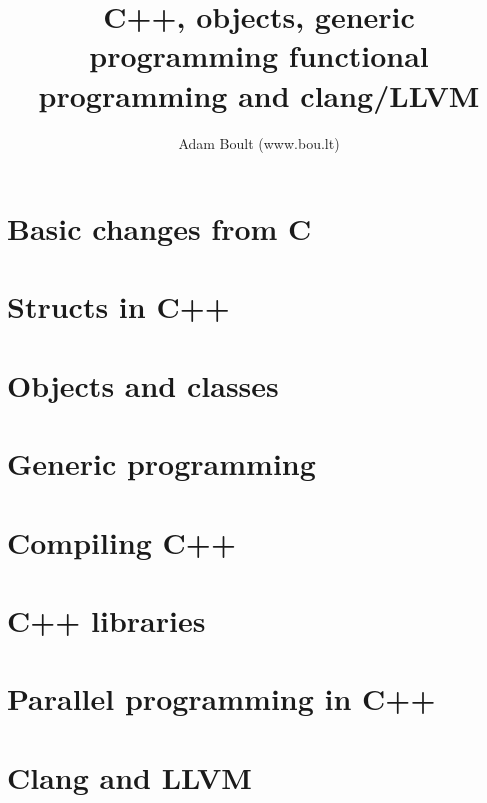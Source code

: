 \documentclass[oneside]{book}
\begin{document}
\author{Adam Boult (www.bou.lt)}
\title{C++, objects, generic programming functional programming and clang/LLVM}
\maketitle

\setcounter{tocdepth}{0}
\tableofcontents



\part{Basic changes from C}








\part{Structs in C++}




\part{Objects and classes}



\part{Generic programming}




\part{Compiling C++}



\part{C++ libraries}




\part{Parallel programming in C++}

\part{Clang and LLVM}

\end{document}
